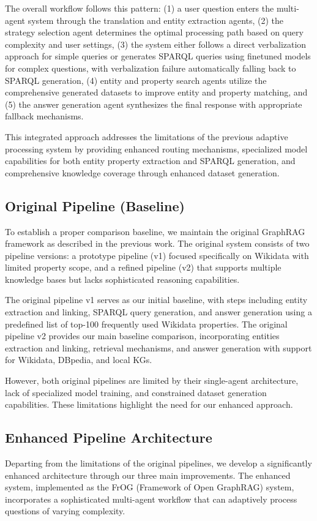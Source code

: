 The overall workflow follows this pattern: (1) a user question enters the multi-agent system through the translation and entity extraction agents, (2) the strategy selection agent determines the optimal processing path based on query complexity and user settings, (3) the system either follows a direct verbalization approach for simple queries or generates SPARQL queries using finetuned models for complex questions, with verbalization failure automatically falling back to SPARQL generation, (4) entity and property search agents utilize the comprehensive generated datasets to improve entity and property matching, and (5) the answer generation agent synthesizes the final response with appropriate fallback mechanisms.

This integrated approach addresses the limitations of the previous adaptive processing system by providing enhanced routing mechanisms, specialized model capabilities for both entity property extraction and SPARQL generation, and comprehensive knowledge coverage through enhanced dataset generation.

\subsection{Original Pipeline (Baseline)}
To establish a proper comparison baseline, we maintain the original GraphRAG framework as described in the previous work. The original system consists of two pipeline versions: a prototype pipeline (v1) focused specifically on Wikidata with limited property scope, and a refined pipeline (v2) that supports multiple knowledge bases but lacks sophisticated reasoning capabilities.

The original pipeline v1 serves as our initial baseline, with steps including entity extraction and linking, SPARQL query generation, and answer generation using a predefined list of top-100 frequently used Wikidata properties. The original pipeline v2 provides our main baseline comparison, incorporating entities extraction and linking, retrieval mechanisms, and answer generation with support for Wikidata, DBpedia, and local KGs.

However, both original pipelines are limited by their single-agent architecture, lack of specialized model training, and constrained dataset generation capabilities. These limitations highlight the need for our enhanced approach.

\subsection{Enhanced Pipeline Architecture}
Departing from the limitations of the original pipelines, we develop a significantly enhanced architecture through our three main improvements. The enhanced system, implemented as the FrOG (Framework of Open GraphRAG) system, incorporates a sophisticated multi-agent workflow that can adaptively process questions of varying complexity.

